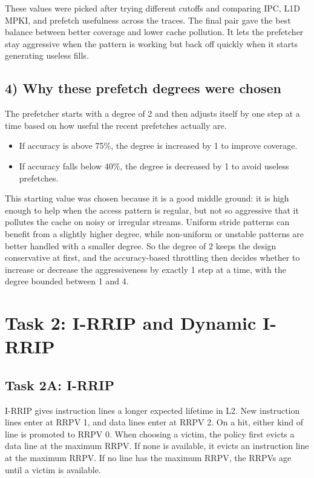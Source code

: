 \documentclass[10pt]{article}
\begin{document}
These values were picked after trying different cutoffs and comparing IPC, L1D MPKI, and prefetch usefulness across the traces. The final pair gave the best balance between better coverage and lower cache pollution. It lets the prefetcher stay aggressive when the pattern is working but back off quickly when it starts generating useless fills.

\subsection*{4) Why these prefetch degrees were chosen}

The prefetcher starts with a degree of 2 and then adjusts itself by one step at a time based on how useful the recent prefetches actually are.

\begin{itemize}
\item If accuracy is above 75\%, the degree is increased by 1 to improve coverage.
\item If accuracy falls below 40\%, the degree is decreased by 1 to avoid useless prefetches.
\end{itemize}

This starting value was chosen because it is a good middle ground: it is high enough to help when the access pattern is regular, but not so aggressive that it pollutes the cache on noisy or irregular streams. Uniform stride patterns can benefit from a slightly higher degree, while non-uniform or unstable patterns are better handled with a smaller degree. So the degree of 2 keeps the design conservative at first, and the accuracy-based throttling then decides whether to increase or decrease the aggressiveness by exactly 1 step at a time, with the degree bounded between 1 and 4.

\clearpage
\section*{Task 2: I-RRIP and Dynamic I-RRIP}

\subsection*{Task 2A: I-RRIP}

I-RRIP gives instruction lines a longer expected lifetime in L2. New instruction lines enter at RRPV 1, and data lines enter at RRPV 2. On a hit, either kind of line is promoted to RRPV 0. When choosing a victim, the policy first evicts a data line at the maximum RRPV. If none is available, it evicts an instruction line at the maximum RRPV. If no line has the maximum RRPV, the RRPVs age until a victim is available.
\end{document}

